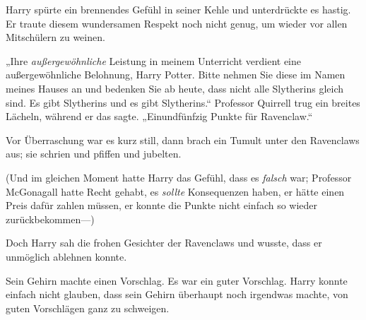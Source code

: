 Harry spürte ein brennendes Gefühl in seiner Kehle und unterdrückte es hastig. Er traute diesem wundersamen Respekt noch nicht genug, um wieder vor allen Mitschülern zu weinen.

„Ihre \emph{außergewöhnliche} Leistung in meinem Unterricht verdient eine außergewöhnliche Belohnung, Harry Potter. Bitte nehmen Sie diese im Namen meines Hauses an und bedenken Sie ab heute, dass nicht alle Slytherins gleich sind. Es gibt Slytherins und es gibt Slytherins.“ Professor Quirrell trug ein breites Lächeln, während er das sagte. „Einundfünfzig Punkte für Ravenclaw.“

Vor Überraschung war es kurz still, dann brach ein Tumult unter den Ravenclaws aus; sie schrien und pfiffen und jubelten.

(Und im gleichen Moment hatte Harry das Gefühl, dass es \emph{falsch} war; Professor McGonagall hatte Recht gehabt, es \emph{sollte} Konsequenzen haben, er hätte einen Preis dafür zahlen müssen, er konnte die Punkte nicht einfach so wieder zurückbekommen—)

Doch Harry sah die frohen Gesichter der Ravenclaws und wusste, dass er unmöglich ablehnen konnte.

Sein Gehirn machte einen Vorschlag. Es war ein guter Vorschlag. Harry konnte einfach nicht glauben, dass sein Gehirn überhaupt noch irgendwas machte, von guten Vorschlägen ganz zu schweigen.

